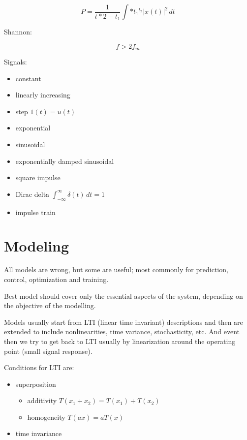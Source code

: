 \documentclass[
]{article}
\providecommand{\tightlist}{%
  \setlength{\itemsep}{0pt}\setlength{\parskip}{0pt}}
\begin{document}
\[ P = \frac{1}{t*2 - t_1} \int\limits*{t_1}^{t_2} |x(t)|^2\, dt \]

Shannon:

\[ f > 2f_m \]

Signals:

\begin{itemize}
\tightlist
\item
  constant
\item
  linearly increasing
\item
  step \(1(t) = u(t)\)
\item
  exponential
\item
  sinusoidal
\item
  exponentially damped sinusoidal
\item
  square impulse
\item
  Dirac delta \(\int_{-\infty}^{\infty} \delta(t)\, dt = 1\)
\item
  impulse train
\end{itemize}

\section{Modeling}\label{modeling}

All models are wrong, but some are useful; most commonly for prediction,
control, optimization and training.

Best model should cover only the essential aspects of the system,
depending on the objective of the modelling.

Models usually start from LTI (linear time invariant) descriptions and
then are extended to include nonlinearities, time variance,
stochasticity, etc. And event then we try to get back to LTI usually by
linearization around the operating point (small signal response).

Conditions for LTI are:

\begin{itemize}
\tightlist
\item
  superposition

  \begin{itemize}
  \tightlist
  \item
    additivity \(T(x_1 + x_2) = T(x_1) + T(x_2)\)
  \item
    homogeneity \(T(ax) = aT(x)\)
  \end{itemize}
\item
  time invariance
\end{itemize}
\end{document}
